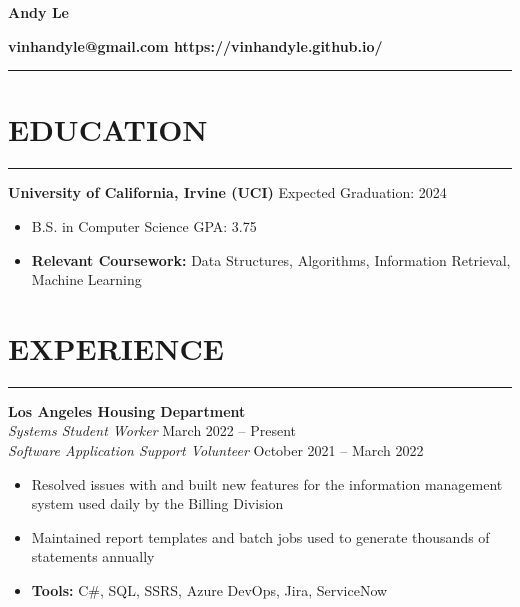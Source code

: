 \documentclass{article}
\newcommand\textline[4][t]{
  \par\noindent\parbox[#1]{.333\textwidth}{\raggedright\texttt{}#2}
  \parbox[#1]{.333\textwidth}{\centering#3}
  \parbox[#1]{.333\textwidth}{\raggedleft#4}\par
}
\begin{document}
	\textline[t]{}{\textbf{\Huge\textbf{Andy Le}}}{}
	\textline[t]{}{\textbf{vinhandyle@gmail.com  https://vinhandyle.github.io/}}{}
	\vspace{10pt}

\vspace{-5pt} \hrule \vspace{-5pt}

\section*{EDUCATION} \vspace{-6pt} \hrule \vspace{6pt}
\textbf{University of California, Irvine (UCI)} \hfill Expected Graduation: 2024
\begin{itemize}
	\item\vspace{-6pt} B.S. in Computer Science  \hfill GPA: 3.75
	\item\vspace{-6pt}\textbf{Relevant Coursework:} Data Structures, Algorithms, Information Retrieval, Machine Learning
\end{itemize}
\vspace{-10pt}

\section*{EXPERIENCE} \vspace{-6pt} \hrule \vspace{6pt}
\textbf{Los Angeles Housing Department}\\
\emph{Systems Student Worker} \hfill March 2022 -- Present\\
\emph{Software Application Support Volunteer} \hfill October 2021 -- March 2022
\begin{itemize}
	\item\vspace{-6pt} Resolved issues with and built new features for the information management system used daily by the Billing Division
	\item\vspace{-6pt} Maintained report templates and batch jobs used to generate thousands of statements annually
	\item\vspace{-6pt} \textbf{Tools:} C\#, SQL, SSRS, Azure DevOps, Jira, ServiceNow
\end{itemize}
\vspace{-10pt}
\end{document}
